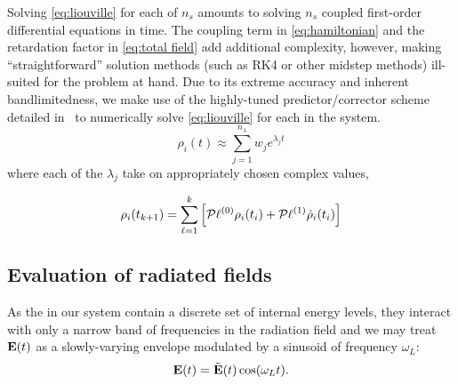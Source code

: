 Solving \cref{eq:liouville} for each of $n_s$ \qds{} amounts to solving $n_s$ coupled first-order differential equations in time.
The coupling term in \cref{eq:hamiltonian} and the retardation factor in \cref{eq:total field} add additional complexity, however, making ``straightforward'' solution methods (such as RK4 or other midstep methods) ill-suited for the problem at hand.
Due to its extreme accuracy and inherent bandlimitedness, we make use of the highly-tuned predictor/corrector scheme detailed in~\cite{Glaser2009} to numerically solve \cref{eq:liouville} for each \qd{} in the system.
\begin{equation}
  \rho_i(t) \approx \sum_{j = 1}^{n_\lambda} w_j e^{\lambda_j t}
\end{equation}
where each of the $\lambda_j$ take on appropriately chosen complex values, 

\begin{equation}
  \rho_i(t_{k + 1}) = \sum_{\ell = 1}^k \qty[\mathcal{P} \ell^{\qty(0)} \rho_i(t_i) + \mathcal{P} \ell^{\qty(1)} \dot{\rho}_i(t_i)]
\end{equation}


\subsection{Evaluation of radiated fields}

As the \qds{} in our system contain a discrete set of internal energy levels, they interact with only a narrow band of frequencies in the radiation field and we may treat $\vb{E}(t)$ as a slowly-varying envelope modulated by a sinusoid of frequency $\omega_L$:
\begin{equation}
  \vb{E}(t) = \tilde{\vb{E}}(t)\cos(\omega_L t).
  \label{eq:modulated field}
\end{equation}


